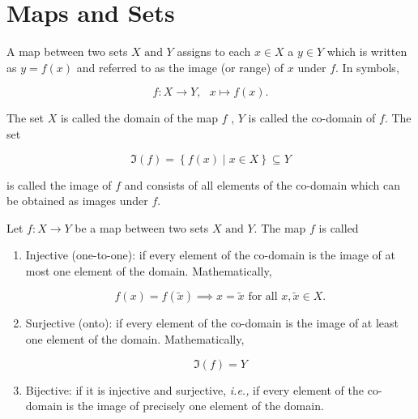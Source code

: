 \documentclass[a4paper,12pt]{report}
\begin{document}
\section{Maps and Sets}

\begin{definition}
A map between two sets \(X \text { and } Y\) assigns to each \(x \in  X \) a \(y \in Y\) which is written as \(y=f(x)\) and referred to as the image (or range) of \(x\) under \(f\). In symbols, 

\begin{equation}
    f:X \rightarrow Y,~~~  x \mapsto f(x).
\end{equation}

The set \(X\) is called the domain of the map \(f\) , \(Y\) is called the co-domain of \(f\). The set 

\begin{equation}
    \Im (f) = \left\{ f(x) \mid x \in  X \right\} \subseteq Y
\end{equation}

is called the image of \(f\) and consists of all elements of the co-domain which can be obtained as images under \(f\). 


\end{definition}

\begin{definition}
Let \(f:X \rightarrow Y\) be a map between two sets \(X \text { and } Y\). The map \(f\) is called

\begin{enumerate}
    \item Injective (one-to-one): if every element of the co-domain is the image of at most one element of the domain. Mathematically,
    
    \begin{equation}
        f(x) = f(\tilde{x} ) \implies x = \tilde{x} \text{ for all } x,\tilde{x} \in X.
    \end{equation}

    \item Surjective (onto): if every element of the co-domain is the image of at least one element of the domain. Mathematically,
    
    \begin{equation}
        \Im (f) = Y
    \end{equation}
    
    \item Bijective: if it is injective and surjective, \textit{i.e.,} if every element of the co-domain is the image of precisely one element of the domain.
   
\end{enumerate}

\end{definition}
\end{document}
